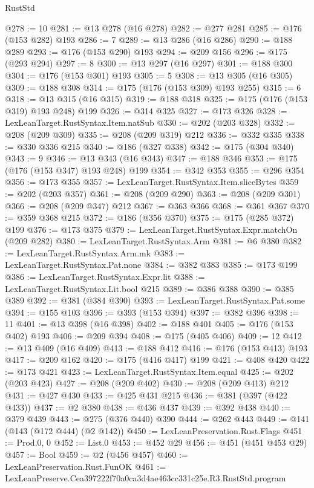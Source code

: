 \begin{lexlean}{RustStd}
\begin{coremodule}
@278 := 10
@281 := @13 @278 (@16 @278)
@282 := @277 @281
@285 := @176 (@153 @282) @193
@286 := 7
@289 := @13 @286 (@16 @286)
@290 := @188 @289
@293 := @176 (@153 @290) @193
@294 := @209 @156
@296 := @175 (@293 @294)
@297 := 8
@300 := @13 @297 (@16 @297)
@301 := @188 @300
@304 := @176 (@153 @301) @193
@305 := 5
@308 := @13 @305 (@16 @305)
@309 := @188 @308
@314 := @175 (@176 (@153 @309) @193 @255)
@315 := 6
@318 := @13 @315 (@16 @315)
@319 := @188 @318
@325 := @175 (@176 (@153 @319) @193 @248) @199
@326 := @314 @325
@327 := @173 @326
@328 := LexLeanTarget.RustSyntax.Item.natSub
@330 := @202 (@203 @328)
@332 := @208 (@209 @309)
@335 := @208 (@209 @319) @212
@336 := @332 @335
@338 := @330 @336 @215
@340 := @186 (@327 @338)
@342 := @175 (@304 @340)
@343 := 9
@346 := @13 @343 (@16 @343)
@347 := @188 @346
@353 := @175 (@176 (@153 @347) @193 @248) @199
@354 := @342 @353
@355 := @296 @354
@356 := @173 @355
@357 := LexLeanTarget.RustSyntax.Item.sliceBytes
@359 := @202 (@203 @357)
@361 := @208 (@209 @290)
@363 := @208 (@209 @301)
@366 := @208 (@209 @347) @212
@367 := @363 @366
@368 := @361 @367
@370 := @359 @368 @215
@372 := @186 (@356 @370)
@375 := @175 (@285 @372) @199
@376 := @173 @375
@379 := LexLeanTarget.RustSyntax.Expr.matchOn (@209 @282)
@380 := LexLeanTarget.RustSyntax.Arm
@381 := @6 @380
@382 := LexLeanTarget.RustSyntax.Arm.mk
@383 := LexLeanTarget.RustSyntax.Pat.none
@384 := @382 @383
@385 := @173 @199
@386 := LexLeanTarget.RustSyntax.Expr.lit
@388 := LexLeanTarget.RustSyntax.Lit.bool @215
@389 := @386 @388
@390 := @385 @389
@392 := @381 (@384 @390)
@393 := LexLeanTarget.RustSyntax.Pat.some
@394 := @155 @103
@396 := @393 (@153 @394)
@397 := @382 @396
@398 := 11
@401 := @13 @398 (@16 @398)
@402 := @188 @401
@405 := @176 (@153 @402) @193
@406 := @209 @394
@408 := @175 (@405 @406)
@409 := 12
@412 := @13 @409 (@16 @409)
@413 := @188 @412
@416 := @176 (@153 @413) @193
@417 := @209 @162
@420 := @175 (@416 @417) @199
@421 := @408 @420
@422 := @173 @421
@423 := LexLeanTarget.RustSyntax.Item.equal
@425 := @202 (@203 @423)
@427 := @208 (@209 @402)
@430 := @208 (@209 @413) @212
@431 := @427 @430
@433 := @425 @431 @215
@436 := @381 (@397 (@422 @433))
@437 := @2 @380
@438 := @436 @437
@439 := @392 @438
@440 := @379 @439
@443 := @275 (@376 @440) @390
@444 := @262 @443
@449 := @141 (@143 (@172 @444) (@2 @142))
@450 := LexLeanPreservation.Rust.Flags
@451 := Prod.{0, 0}
@452 := List.{0}
@453 := @452 @29
@456 := @451 (@451 @453 @29)
@457 := Bool
@459 := @2 (@456 @457)
@460 := LexLeanPreservation.Rust.FunOK
@461 := LexLeanPreserve.Cea397222f70a0ca3d4ae463cc331c25e.R3.RustStd.program

\end{coremodule}
\end{lexlean}
